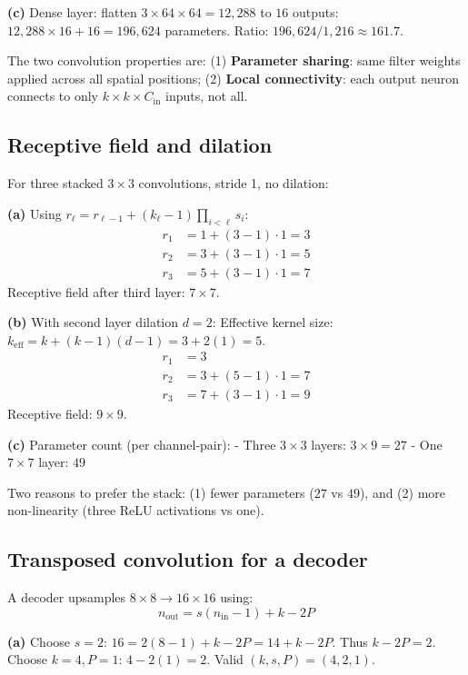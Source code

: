 \documentclass[10pt,twocolumn,letterpaper]{article}
\begin{document}
\textbf{(c)} Dense layer: flatten $3\times64\times64 = 12,288$ to $16$ outputs:
$12,288 \times 16 + 16 = 196,624$ parameters.
Ratio: $196,624 / 1,216 \approx 161.7$.

The two convolution properties are: (1) \textbf{Parameter sharing}: same
filter weights applied across all spatial positions; (2) \textbf{Local
connectivity}: each output neuron connects to only $k\times k\times C_{\text{in}}$
inputs, not all.

\subsection{Receptive field and dilation}

For three stacked $3\times3$ convolutions, stride 1, no dilation:

\textbf{(a)} Using $r_\ell = r_{\ell-1} + (k_\ell - 1)\prod_{i<\ell} s_i$:
\begin{align*}
r_1 &= 1 + (3-1)\cdot 1 = 3 \\
r_2 &= 3 + (3-1)\cdot 1 = 5 \\
r_3 &= 5 + (3-1)\cdot 1 = 7
\end{align*}
Receptive field after third layer: $7 \times 7$.

\textbf{(b)} With second layer dilation $d=2$:
Effective kernel size: $k_{\text{eff}} = k + (k-1)(d-1) = 3 + 2(1) = 5$.
\begin{align*}
r_1 &= 3 \\
r_2 &= 3 + (5-1)\cdot 1 = 7 \\
r_3 &= 7 + (3-1)\cdot 1 = 9
\end{align*}
Receptive field: $9 \times 9$.

\textbf{(c)} Parameter count (per channel-pair):
- Three $3\times3$ layers: $3 \times 9 = 27$
- One $7\times7$ layer: $49$

Two reasons to prefer the stack: (1) fewer parameters ($27$ vs $49$), and
(2) more non-linearity (three ReLU activations vs one).

\subsection{Transposed convolution for a decoder}

A decoder upsamples $8\times8 \to 16\times16$ using:
\begin{equation}
n_{\text{out}} = s(n_{\text{in}} - 1) + k - 2P
\end{equation}

\textbf{(a)} Choose $s=2$: $16 = 2(8-1) + k - 2P = 14 + k - 2P$.
Thus $k - 2P = 2$. Choose $k=4, P=1$: $4 - 2(1) = 2$. Valid $(k,s,P) = (4,2,1)$.
\end{document}
